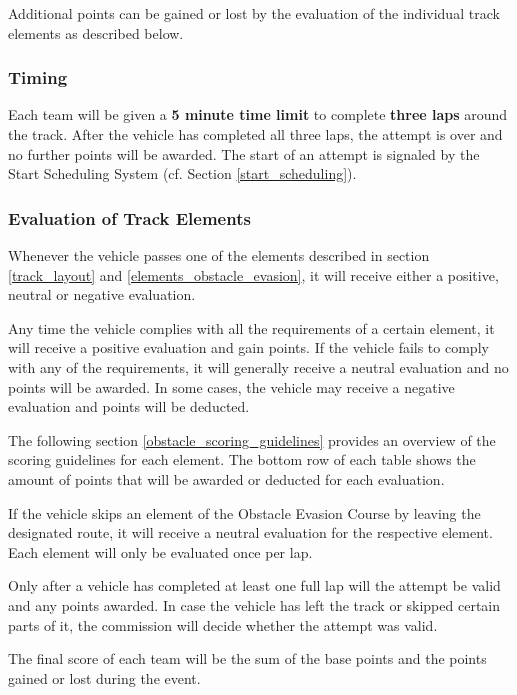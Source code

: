 Additional points can be gained or lost by the evaluation of the individual track elements as described below.

\subsubsection{Timing}

Each team will be given a \textbf{5 minute time limit} to complete \textbf{three laps} around the track.
After the vehicle has completed all three laps, the attempt is over and no further points will be awarded.
The start of an attempt is signaled by the Start Scheduling System (cf. Section \ref{start_scheduling}).

\subsubsection{Evaluation of Track Elements}
\label{obstacle_evaluation}

Whenever the vehicle passes one of the elements described in section \ref{track_layout} and \ref{elements_obstacle_evasion}, it will receive either a positive, neutral or negative evaluation.

Any time the vehicle complies with all the requirements of a certain element, it will receive a positive evaluation and gain points.
If the vehicle fails to comply with any of the requirements, it will generally receive a neutral evaluation and no points will be awarded.
In some cases, the vehicle may receive a negative evaluation and points will be deducted.

The following section \ref{obstacle_scoring_guidelines} provides an overview of the scoring guidelines for each element.
The bottom row of each table shows the amount of points that will be awarded or deducted for each evaluation.

If the vehicle skips an element of the Obstacle Evasion Course by leaving the designated route, it will receive a neutral evaluation for the respective element.
Each element will only be evaluated once per lap.

Only after a vehicle has completed at least one full lap will the attempt be valid and any points awarded.
In case the vehicle has left the track or skipped certain parts of it, the commission will decide whether the attempt was valid.

The final score of each team will be the sum of the base points and the points gained or lost during the event.

\newpage

